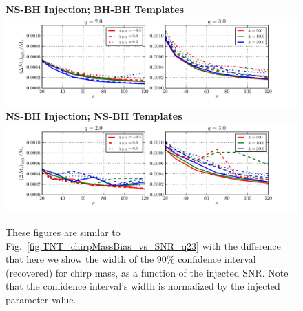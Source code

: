 \documentclass[aps,prd,amsmath,floats,floatfix, twocolumn,
superscriptaddress,nofootinbib,showpacs]{revtex4-1}
\begin{document}
% 
\begin{figure}
\centering 
\textbf{NS-BH Injection; BH-BH Templates}
\includegraphics[width=1.7\columnwidth]{plots/TN_chirpMassCIWidth90_vs_SNR_q23.pdf}\\ 
\textbf{NS-BH Injection; NS-BH Templates}
\includegraphics[width=1.7\columnwidth]{plots/TT_chirpMassCIWidth90_vs_SNR_q23.pdf}%
\caption{These figures are similar to Fig.~\ref{fig:TNT_chirpMassBias_vs_SNR_q23}
with the difference that here we show the width of the $90\%$ confidence 
interval (recovered) for chirp mass, as a function of the injected SNR. 
Note that the confidence interval's width is normalized by the injected
parameter value.
}
\label{fig:TNT_chirpMassCIWidth90_vs_SNR_q23}
\end{figure}
% 
\newpage
\newpage
\end{document}
